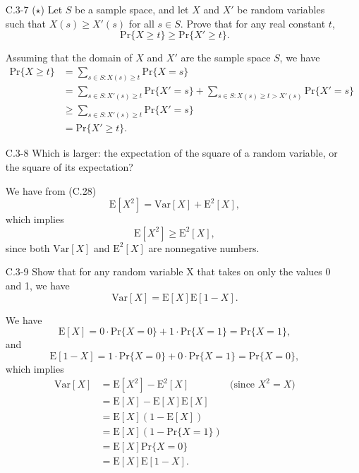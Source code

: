 \begin{enumerate}
\newpage

\item[C.3{-}7]{($\star$) Let $S$ be a sample space, and let $X$ and $X'$ be
random variables such that $X(s) \ge X'(s)$ for all $s \in S$. Prove that for
any real constant $t$,
\[
  \text{Pr}\{X \ge t\} \ge \text{Pr}\{X' \ge t\}.
\]
}

\begin{framed}
Assuming that the domain of $X$ and $X'$ are the sample space $S$, we have
\begin{equation*}
\begin{aligned}
  \text{Pr}\{X \ge t\} &=   \sum_{s \in S:X(s) \ge t}{\text{Pr}\{X = s\}}\\
                       &=   \sum_{s \in S:X'(s) \ge t}{\text{Pr}\{X' = s\}} + \sum_{s \in S:X(s) \ge t > X'(s)}{\text{Pr}\{X' = s\}}\\
                       &\ge \sum_{s \in S:X'(s) \ge t}{\text{Pr}\{X' = s\}}\\
                       &=   \text{Pr}\{X' \ge t\}.
\end{aligned}
\end{equation*}
\end{framed}

\item[C.3{-}8]{Which is larger: the expectation of the square of a random
variable, or the square of its expectation?}

\begin{framed}
We have from (C.28)
\[
  \text{E}[X^2] = \text{Var}[X] + \text{E}^2[X],
\]
which implies
\[
  \text{E}[X^2] \ge \text{E}^2[X],
\]
since both $\text{Var}[X]$ and $\text{E}^2[X]$ are nonnegative numbers.

\end{framed}

\item[C.3{-}9]{Show that for any random variable X that takes on only the values
0 and 1, we have
\[
  \text{Var}[X] = \text{E}[X] \text{E}[1 - X].
\]
}

\begin{framed}
We have
\[
  \text{E}[X] = 0 \cdot \text{Pr}\{X = 0\} + 1 \cdot \text{Pr}\{X = 1\} = \text{Pr}\{X = 1\},
\]
and
\[
  \text{E}[1 - X] = 1 \cdot \text{Pr}\{X = 0\} + 0 \cdot \text{Pr}\{X = 1\} = \text{Pr}\{X = 0\},
\]
which implies
\begin{equation*}
\begin{aligned}
  \text{Var}[X] &= \text{E}[X^2] - \text{E}^2[X] & \text{(since $X^2 = X$)}\\
                &= \text{E}[X] - \text{E}[X] \text{E}[X]\\
                &= \text{E}[X] (1 - \text{E}[X])\\
                &= \text{E}[X] (1 - \text{Pr}\{X = 1\})\\
                &= \text{E}[X] \text{Pr}\{X = 0\}\\
                &= \text{E}[X] \text{E}[1 - X].
\end{aligned}
\end{equation*}
\end{framed}


\end{enumerate}
